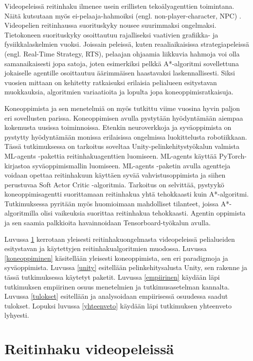 \documentclass[utf8]{gradu3}
\begin{document}
Videopeleissä reitinhaku ilmenee usein erillisten tekoälyagenttien toimintana. Näitä kutsutaan myös ei-pelaaja-hahmoiksi (engl. non-player-character, NPC) \parencite{cui2011based}. Videopelien reitinhaussa suorituskyky nousee suurimmaksi ongelmaksi. Tietokoneen suorituskyky osoittautuu rajalliseksi vaativien grafiikka- ja fysiikkalaskelmien vuoksi. Joissain peleissä, kuten reaaliaikaisissa strategiapeleissä (engl. Real-Time Strategy, RTS), pelaajan ohjaamia liikkuvia hahmoja voi olla samanaikaisesti jopa satoja, joten esimerkiksi pelkkä A*-algoritmi sovellettuna jokaiselle agentille osoittautuu äärimmäisen haastavaksi laskennallisesti. Siksi vuosien mittaan on kehitetty ratkaisuksi erilaisia pelialueen esitystavan muokkauksia, algoritmien variaatioita ja lopulta jopa koneoppimisratkaisuja.

Koneoppimista ja sen menetelmiä on myös tutkittu viime vuosina hyvin paljon eri sovellusten parissa. Koneoppimisen avulla pystytään hyödyntämään aiempaa kokemusta uusissa toiminnoissa. Etenkin neuroverkkoja ja syväoppimista on pystytty hyödyntämään monissa erilaisissa ongelmissa luokittelusta robotiikkaan. Tässä tutkimuksessa on tarkoitus soveltaa Unity-pelinkehitystyökalun valmista ML-agents -pakettia reitinhakuagenttien luomiseen. ML-agents käyttää PyTorch-kirjastoa syväoppimismallin luomiseen. ML-agents -paketin avulla agentteja voidaan opettaa reitinhakuun käyttäen syvää vahvistusoppimista ja siihen perustuvaa Soft Actor Critic -algoritmia. Tarkoitus on selvittää, pystyykö koneoppimisagentti suorittamaan reitinhakua yhtä tehokkaasti kuin A*-algoritmi. Tutkimuksessa pyritään myös huomioimaan mahdolliset tilanteet, joissa A*-algoritmilla olisi vaikeuksia suorittaa reitinhakua tehokkaasti. Agentin oppimista ja sen saamia palkkioita havainnoidaan Tensorboard-työkalun avulla.

Luvussa \ref{reitinhakupeleis} kerrotaan yleisesti reitinhakuongelmasta videopeleissä pelialueiden esitystavan ja käytettyjen reitinhakualgoritmien muodossa. Luvussa \ref{koneoppiminen} käsitellään yleisesti koneoppimista, sen eri paradigmoja ja syväoppimista. Luvussa \ref{unity} esitellään pelinkehitysalusta Unity, sen rakenne ja tässä tutkimuksessa käytetyt paketit. Luvussa \ref{empiirinen} käydään läpi tutkimuksen empiirinen osuus menetelmien ja tutkimusasetelman kannalta. Luvussa \ref{tulokset} esitellään ja analysoidaan empiirisessä osuudessa saadut tulokset. Lopuksi luvussa \ref{yhteenveto} käydään läpi tutkimuksen yhteenveto lyhyesti.

\chapter{Reitinhaku videopeleissä}
\label{reitinhakupeleis}
\end{document}
